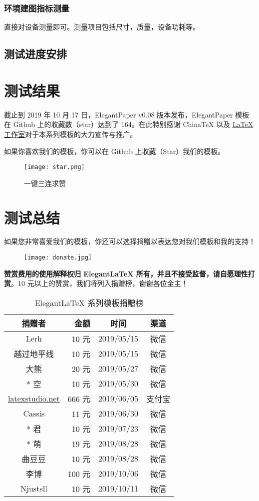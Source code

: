 \documentclass[lang=cn,11pt,a4paper]{elegantpaper}
\begin{document}
\subsubsection{环境建图指标测量}
直接对设备测量即可。测量项目包括尺寸，质量，设备功耗等。

\subsection{测试进度安排}


\section{测试结果}
截止到 2019 年 10 月 17 日，ElegantPaper v0.08 版本发布，ElegantPaper 模板在 Github 上的收藏数（star）达到了 164。在此特别感谢 China\TeX{} 以及 \href{http://www.latexstudio.net/}{\LaTeX{} 工作室}对于本系列模板的大力宣传与推广。

如果你喜欢我们的模板，你可以在 Github 上收藏（Star）我们的模板。
\begin{figure}[htbp]
  \centering
  \texttt{[image: star.png]}
  \caption{一键三连求赞}
\end{figure}

\section{测试总结}
如果您非常喜爱我们的模板，你还可以选择捐赠以表达您对我们模板和我的支持！

\begin{figure}[htbp]
  \centering
  \texttt{[image: donate.jpg]}
\end{figure}

\textbf{赞赏费用的使用解释权归 Elegant\LaTeX{} 所有，并且不接受监督，请自愿理性打赏}。10 元以上的赞赏，我们将列入捐赠榜，谢谢各位金主！

\begin{table}[!htbp]
  \centering
  \caption{Elegant\LaTeX{} 系列模板捐赠榜}
  \begin{tabular}{crcc}
    \toprule
    捐赠者   & 金额 & 时间 & 渠道 \\
    \midrule
    Lerh  & 10 元  & 2019/05/15 & 微信 \\
    越过地平线 & 10 元    & 2019/05/15 & 微信 \\
    大熊 &  20 元 & 2019/05/27 & 微信 \\
    * 空 & 10 元 & 2019/05/30 & 微信\\
    \href{http://www.latexstudio.net/}{latexstudio.net} & 666 元 & 2019/06/05 & 支付宝\\
    Cassis & 11 元 & 2019/06/30 & 微信\\
    * 君 & 10 元 & 2019/07/23 & 微信\\
    * 萌 & 19 元 & 2019/08/28 & 微信 \\
    曲豆豆 & 10 元 & 2019/08/28 & 微信 \\
    李博 & 100 元 & 2019/10/06 & 微信\\
    Njustsll & 10 元 & 2019/10/11 & 微信 \\
  \bottomrule
  \end{tabular}%
\end{table}%
\end{document}
